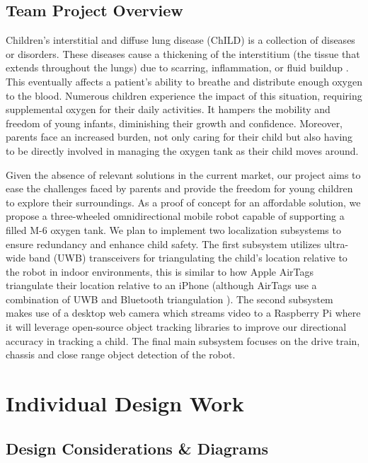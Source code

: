 \documentclass{report}
\begin{document}
    \section{Team Project Overview}
    Children's interstitial and diffuse lung disease (ChILD) is a collection of diseases or disorders. These diseases cause a thickening of the interstitium (the tissue that extends throughout the lungs) due to scarring, inflammation, or fluid buildup \cite{ChILD-2022}. This eventually affects a patient’s ability to breathe and distribute enough oxygen to the blood. Numerous children experience the impact of this situation, requiring supplemental oxygen for their daily activities. It hampers the mobility and freedom of young infants, diminishing their growth and confidence. Moreover, parents face an increased burden, not only caring for their child but also having to be directly involved in managing the oxygen tank as their child moves around.

    Given the absence of relevant solutions in the current market, our project aims to ease the challenges faced by parents and provide the freedom for young children to explore their surroundings. As a proof of concept for an affordable solution, we propose a three-wheeled omnidirectional mobile robot capable of supporting a filled M-6 oxygen tank. We plan to implement two localization subsystems to ensure redundancy and enhance child safety. The first subsystem utilizes ultra-wide band (UWB) transceivers for triangulating the child's location relative to the robot in indoor environments, this is similar to how Apple AirTags triangulate their location relative to an iPhone \cite{airtag_uwb} (although AirTags use a combination of UWB and Bluetooth triangulation \cite{airtag_ble}). The second subsystem makes use of a desktop web camera which streams video to a Raspberry Pi where it will leverage open-source object tracking libraries to improve our directional accuracy in tracking a child. The final main subsystem focuses on the drive train, chassis and close range object detection of the robot.

    \chapter{Individual Design Work}
    \section{Design Considerations \& Diagrams}
\end{document}
